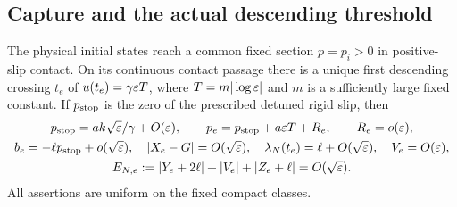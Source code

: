 \subsection{Capture and the actual descending threshold}

\begin{lemma}\label{lem:detuned-threshold}
The physical initial states reach a common fixed section $p=p_i>0$
in positive-slip contact. On its continuous contact passage there is a
unique first descending crossing $t_e$ of $u(t_e)=\gamma\varepsilon T$,
where $T=m|\log\varepsilon|$ and $m$ is a sufficiently large fixed constant.
If $p_{\rm stop}$ is the zero of the prescribed detuned rigid slip,
then
\begin{gather}
 p_{\rm stop}=ak\sqrt{\varepsilon}/\gamma+O(\varepsilon),\qquad
 p_e=p_{\rm stop}+a\varepsilon T+R_e,\qquad R_e=o(\varepsilon),
 \label{ent:threshold-slow}\\
 b_e=-\ell p_{\rm stop}+o(\sqrt{\varepsilon}),\quad
 |X_e-G|=O(\sqrt{\varepsilon}),\quad
 \lambda_N(t_e)=\ell+O(\sqrt{\varepsilon}),\quad V_e=O(\varepsilon),\\
 E_{N,e}:=|Y_e+2\ell|+|V_e|+|Z_e+\ell|=O(\sqrt{\varepsilon}).
 \label{ent:threshold-normal}
\end{gather}
All assertions are uniform on the fixed compact classes.
\end{lemma}
